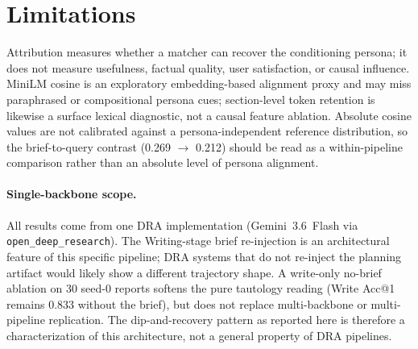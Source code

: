 \documentclass[]{article}
\begin{document}
\section{Limitations}
\label{sec:limitations}

Attribution measures whether a matcher can recover the conditioning persona;
it does not measure usefulness, factual quality, user satisfaction, or causal
influence.
MiniLM cosine is an exploratory embedding-based alignment proxy and may miss
paraphrased or compositional persona cues; section-level token retention is
likewise a surface lexical diagnostic, not a causal feature ablation.
Absolute cosine values are not calibrated against a persona-independent
reference distribution, so the brief-to-query contrast (0.269 $\to$ 0.212)
should be read as a within-pipeline comparison rather than an absolute level
of persona alignment.

\paragraph{Single-backbone scope.}
All results come from one DRA implementation (Gemini~3.6~Flash via
\texttt{open\_deep\_research}).
The Writing-stage brief re-injection is an architectural feature of this
specific pipeline; DRA systems that do not re-inject the planning artifact
would likely show a different trajectory shape.
A write-only no-brief ablation on 30 seed-0 reports softens the pure
tautology reading (Write Acc@1 remains 0.833 without the brief), but does not
replace multi-backbone or multi-pipeline replication.
The dip-and-recovery pattern as reported here is therefore a
characterization of this architecture, not a general property of DRA pipelines.
\end{document}

